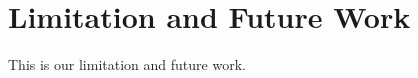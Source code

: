 \section{Limitation and Future Work}
\label{sec.limitation}
This is our limitation and future work. 